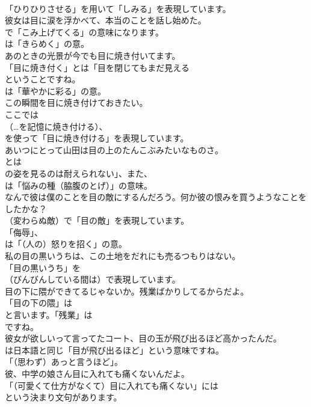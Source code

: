 \documentclass[8pt]{extreport}
\begin{document}
\begin{CJK}{UTF8}{min}
\\	「ひりひりさせる」を用いて「しみる」を表現しています。	
\\	彼女は目に涙を浮かべて、本当のことを話し始めた。 
\\	で「こみ上げてくる」の意味になります。
\\	は「きらめく」の意。	
\\	あのときの光景が今でも目に焼き付いてます。 
\\	「目に焼き付く」とは「目を閉じてもまだ見える
\\	ということですね。
\\	は「華やかに彩る」の意。	
\\	この瞬間を目に焼き付けておきたい。 
\\	ここでは 
\\	（…を記憶に焼き付ける）、
\\	を使って「目に焼き付ける」を表現しています。	
\\	あいつにとって山田は目の上のたんこぶみたいなものさ。 
\\	とは
\\	の姿を見るのは耐えられない」、また、
\\	は「悩みの種（脇腹のとげ）」の意味。	
\\	なんで彼は僕のことを目の敵にするんだろう。何か彼の恨みを買うようなことをしたかな？ 
\\	（変わらぬ敵）で「目の敵」を表現しています。
\\	「侮辱」、
\\	は「（人の）怒りを招く」の意。	
\\	私の目の黒いうちは、この土地をだれにも売るつもりはない。 
\\	「目の黒いうち」を 
\\	（びんびんしている間は）で表現しています。	
\\	目の下に隈ができてるじゃないか。残業ばかりしてるからだよ。 
\\	「目の下の隈」は
\\	と言います。「残業」は
\\	ですね。	
\\	彼女が欲しいって言ってたコート、目の玉が飛び出るほど高かったんだ。 
\\	は日本語と同じ「目が飛び出るほど」という意味ですね。
\\	「（思わず）あっと言うほど」。	
\\	彼、中学の娘さん目に入れても痛くないんだよ。 
\\	「（可愛くて仕方がなくて）目に入れても痛くない」には
\\	という決まり文句があります。	

\end{CJK}
\end{document}
